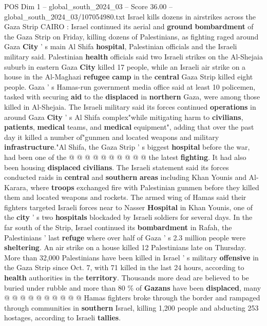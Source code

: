\begin{textsample}{POS Dim 1 – global\_south\_2024\_03 – Score 36.00 – global\_south\_2024\_03/107054980.txt}  \label{ex:f1_pos_007}
Israel kills dozens in airstrikes across the Gaza Strip CAIRO : Israel continued its aerial and \textbf{ground} \textbf{bombardment} of the Gaza Strip on Friday, killing dozens of Palestinians, as fighting raged around Gaza \textbf{City} ' s main Al Shifa \textbf{hospital}, Palestinian officials and the Israeli military said.
Palestinian \textbf{health} officials said two Israeli strikes on the Al-Shejaia suburb in eastern Gaza \textbf{City} killed 17 people, while an Israeli air strike on a house in the Al-Maghazi \textbf{refugee} \textbf{camp} in the \textbf{central} Gaza Strip killed eight people.
Gaza ' s Hamas-run government media office said at least 10 policemen, tasked with securing \textbf{aid} to the \textbf{displaced} in \textbf{northern} Gaza, were among those killed in Al-Shejaia.
The Israeli military said its forces continued \textbf{operations} in around Gaza \textbf{City} ' s Al Shifa complex"while mitigating harm to \textbf{civilians}, \textbf{patients}, \textbf{medical} teams, and \textbf{medical} equipment", adding that over the past day it killed a number of"gunmen and located weapons and military \textbf{infrastructure}."Al Shifa, the Gaza Strip ' s biggest \textbf{hospital} before the war, had been one of the @ @ @ @ @ @ @ @ @ @ the latest \textbf{fighting}.
It had also been housing \textbf{displaced} \textbf{civilians}.
The Israeli statement said its forces conducted raids in \textbf{central} and \textbf{southern} \textbf{areas} including Khan Younis and Al-Karara, where \textbf{troops} exchanged fire with Palestinian gunmen before they killed them and located weapons and rockets.
The armed wing of Hamas said their fighters targeted Israeli forces near to Nasser \textbf{Hospital} in Khan Younis, one of the \textbf{city} ' s two \textbf{hospitals} blockaded by Israeli soldiers for several days.
In the far south of the Strip, Israel continued its \textbf{bombardment} in Rafah, the Palestinians ' last \textbf{refuge} where over half of Gaza ' s 2.3 million people were \textbf{sheltering}.
An air strike on a house killed 12 Palestinians late on Thursday.
More than 32,000 Palestinians have been killed in Israel ' s military \textbf{offensive} in the Gaza Strip since Oct. 7, with 71 killed in the last 24 hours, according to \textbf{health} authorities in the \textbf{territory}.
Thousands more dead are believed to be buried under rubble and more than 80 \% of \textbf{Gazans} have been \textbf{displaced}, many @ @ @ @ @ @ @ @ @ @ Hamas fighters broke through the border and rampaged through communities in \textbf{southern} Israel, killing 1,200 people and abducting 253 hostages, according to Israeli \textbf{tallies}.

\end{textsample}
